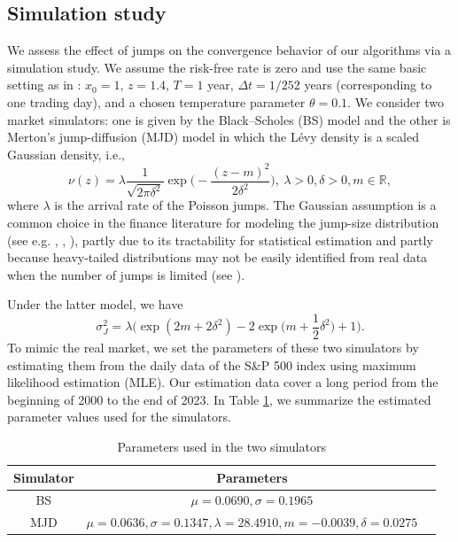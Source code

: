 \documentclass[11pt]{article}
\newcommand{\1}{\mathbbm{1}}
\begin{document}
\subsection{Simulation study}
We assess the effect of jumps on the convergence behavior of our algorithms via a simulation study. We assume the risk-free rate is zero and use the same basic setting as in \cite{jia2022q}: $x_0 = 1$, $z = 1.4$, $T = 1$ year, $\Delta t = 1/252$ years (corresponding to one trading day), and a chosen temperature parameter $\theta = 0.1$. We consider two market simulators: one is given by the Black--Scholes (BS) model and the other is Merton's jump-diffusion (MJD) model in which the L\'evy density is a scaled Gaussian density, i.e.,
\begin{equation}\label{eq:Levy-den-Gauss}
	\nu(z)=\lambda\frac{1}{\sqrt{2\pi\delta^2}}\exp\bigg(-\frac{(z-m)^2}{2\delta^2}\bigg),\ \lambda>0, \delta>0, m\in\mathbb{R},
\end{equation}
where $\lambda$ is the arrival rate of the Poisson jumps. The Gaussian assumption is a common choice in the finance literature for modeling the jump-size distribution (see e.g. \citealt{merton1976option}, \citealt{bates1991crash}, \citealt{das2002surprise}), partly due to its tractability for statistical estimation and partly because heavy-tailed distributions may not be easily identified from real data when the number of jumps is limited (see \citealt{heyde2004controversy}).

Under the latter model, we have
\begin{equation}
	\sigma_J^2=\lambda\bigg(\exp(2m+2\delta^2)-2\exp\bigg(m+\frac{1}{2}\delta^2\bigg)+1\bigg).
\end{equation}
To mimic the real market, we set the parameters of these two simulators by estimating them from the daily data of the S\&P 500 index using maximum likelihood estimation (MLE). Our estimation data cover a long period from the beginning of 2000 to the end of 2023. In Table \ref{tab:MVPS-params}, we summarize the estimated parameter values used for the simulators.

\begin{table}[h]
	\centering
	\begin{tabular}{ccc}
		\hline
		\textbf{Simulator} & \textbf{Parameters} \\ \hline
		BS & $\mu = 0.0690, \sigma = 0.1965$  \\ \hline
		MJD & $\mu = 0.0636, \sigma = 0.1347, \lambda = 28.4910, m = -0.0039, \delta = 0.0275$ \\\hline
	\end{tabular}
	\caption{Parameters used in the two simulators}\label{tab:MVPS-params}
\end{table}
\end{document}
